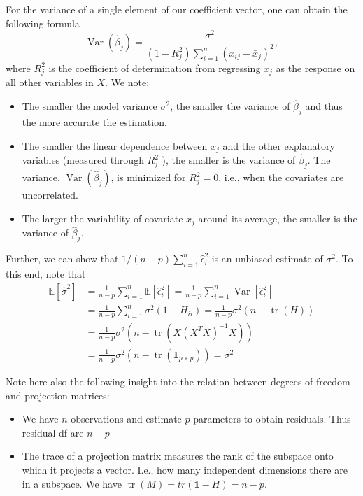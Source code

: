 \documentclass[11pt, %
	oneside, %
	english, %
	onehalfspacing, %
	]{article} %
\numberwithin{equation}{section}
\begin{document}
For the variance of a single element of our coefficient vector, one can obtain the following formula
\begin{equation*}
    \operatorname{Var}\left(\hat{\beta}_j\right)=\frac{\sigma^2}{\left(1-R_j^2\right) \sum_{i=1}^n\left(x_{i j}-\bar{x}_j\right)^2},
\end{equation*}
where $R^2_j$ is the coefficient of determination from regressing $x_j$ as the response on all other variables in $X$. We note:

\begin{itemize}
    \item The smaller the model variance $\sigma^2$, the smaller the variance of $\hat{\beta}_j$ and thus the more accurate the estimation.
    \item The smaller the linear dependence between $x_j$ and the other explanatory variables (measured through $R_j^2$ ), the smaller is the variance of $\hat{\beta}_j$. The variance, $\operatorname{Var}\left(\hat{\beta}_j\right)$, is minimized for $R_j^2=0$, i.e., when the covariates are uncorrelated.
    \item The larger the variability of covariate $x_j$ around its average, the smaller is the variance of $\hat{\beta}_j$.
\end{itemize}

Further, we can show that $1/(n-p) \sum_{i=1}^{n} \hat{\epsilon}_i^2$ is an unbiased estimate of $\sigma^2$. To this end, note that
\begin{equation*}
    \begin{aligned}
        \mathbb{E} \left[\hat{\sigma}^2\right]&=\frac{1}{n-p} \sum_{i=1}^{n} \mathbb{E} \left[ \hat{\epsilon}_i^2\right] =\frac{1}{n-p} \sum_{i=1}^{n} \operatorname{Var} \left[ \hat{\epsilon}_i^2\right] \\
        &=\frac{1}{n-p} \sum_{i=1}^{n} \sigma^2 (1-H_{ii})=\frac{1}{n-p} \sigma^2 \left(n- \operatorname{tr}({H})\right) \\
        &=\frac{1}{n-p}  \sigma^2 \left( n - \operatorname{tr}(X (X^TX)^{-1} X)\right) \\
        &=\frac{1}{n-p}  \sigma^2 \left( n - \operatorname{tr}(\mathbf{1}_{p\times p})\right)=\sigma^2
    \end{aligned}
\end{equation*}

Note here also the following insight into the relation between degrees of freedom and projection matrices:
\begin{itemize}
    \item We have $n$ observations and estimate $p$ parameters to obtain residuals. Thus residual df are $n-p$
    \item The trace of a projection matrix measures the rank of the subspace onto which it projects a vector. I.e., how many independent dimensions there are in a subspace. We have $\operatorname{tr}(M) = tr(\mathbf{1}-H) = n-p.$
\end{itemize}
\end{document}

